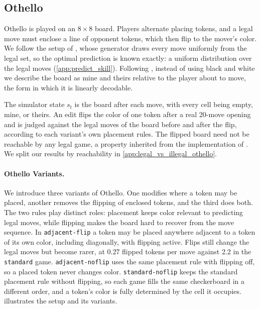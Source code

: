 \documentclass{article} %
\begin{document}
\subsection{Othello}
\label{sec:othello_experiments}
Othello is played on an $8 \times 8$ board. Players alternate placing tokens, and a legal move must enclose a line of opponent tokens, which then flip to the mover's color. We follow the setup of \citet{li2023othello}, whose generator draws every move uniformly from the legal set, so the optimal prediction is known exactly: a uniform distribution over the legal moves (\cref{app:predict_skill}). Following \citet{nanda2023linear}, instead of using black and white we describe the board as mine and theirs relative to the player about to move, the form in which it is linearly decodable.

The simulator state $s_t$ is the board after each move, with every cell being empty, mine, or theirs. An edit flips the color of one token after a real 20-move opening and is judged against the legal moves of the board before and after the flip, according to each variant's own placement rules. The flipped board need not be reachable by any legal game, a property inherited from the implementation of \citet{li2023othello}. We split our results by reachability in \cref{app:legal_vs_illegal_othello}.


\paragraph{Othello Variants.}
We introduce three variants of Othello. One modifies where a token may be placed, another removes the flipping of enclosed tokens, and the third does both. The two rules play distinct roles: placement keeps color relevant to predicting legal moves, while flipping makes the board hard to recover from the move sequence. In \texttt{adjacent-flip} a token may be placed anywhere adjacent to a token of its own color, including diagonally, with flipping active. Flips still change the legal moves but become rarer, at 0.27 flipped tokens per move against 2.2 in the \texttt{standard} game. \texttt{adjacent-noflip} uses the same placement rule with flipping off, so a placed token never changes color. \texttt{standard-noflip} keeps the standard placement rule without flipping, so each game fills the same checkerboard in a different order, and a token's color is fully determined by the cell it occupies.  illustrates the setup and its variants.
\end{document}
